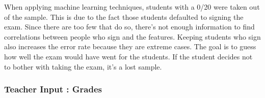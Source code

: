\documentclass[a4paper,11pt]{report}
\numberwithin{figure}{section} %
\begin{document}
    When applying machine learning techniques, students with a 0/20 were taken out of the sample. This is due to the fact those students defaulted to signing the exam. Since there are too few that do so, there's not enough information to find correlations between people who sign and the features. Keeping students who sign also increases the error rate because they are extreme cases. The goal is to guess how well the exam would have went for the students. If the student decides not to bother with taking the exam, it's a lost sample.\newline
    
    	\subsubsection{Teacher Input : Grades}
    
    
\end{document}
